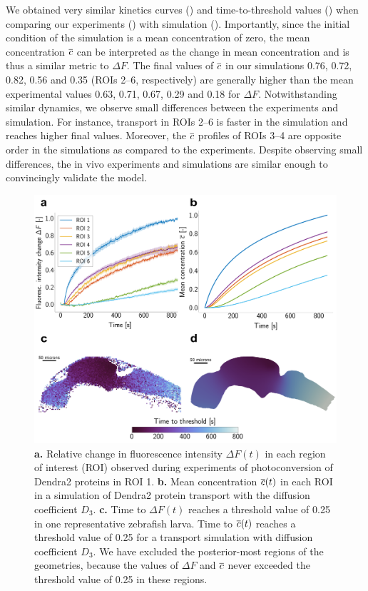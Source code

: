 \documentclass{WileyMSP-template}
\begin{document}
We obtained very similar kinetics curves ()
and time-to-threshold values () when comparing our
experiments () with
simulation ().
Importantly, since the initial condition of the simulation is a mean concentration of zero,
the mean concentration $\overline{c}$ can be interpreted as the change in mean concentration and
is thus a similar metric to $\Delta F$.
The final values of $\overline{c}$ in our simulations 0.76, 0.72, 0.82, 0.56 and 0.35
(ROIs 2--6, respectively)
are generally higher than the mean experimental values 0.63, 0.71, 0.67, 0.29 and 0.18 for $\Delta F$.
Notwithstanding similar dynamics, we observe small differences between the experiments and simulation.
For instance, transport in ROIs 2--6 is faster in the simulation and reaches higher final values.
Moreover, the $\overline{c}$ profiles of ROIs 3--4 are opposite order in
the simulations as compared to the experiments.
Despite observing small differences, the in vivo experiments and
simulations are similar enough to convincingly validate the model.
\begin{figure}[H]
    \centering
    \includegraphics[width=\textwidth]{graphics/figure3_compare_experiments_and_simulations.png}
    \caption{
    \textbf{a.} Relative change in fluorescence intensity $\Delta F(t)$ 
    in each region of interest (ROI)
    observed during experiments of photoconversion of Dendra2 proteins in ROI 1.
    \textbf{b.} Mean concentration $\overline{c}(t)$ in each ROI in a
    simulation of Dendra2 protein transport with
    the diffusion coefficient $D_3$.
    \textbf{c.} Time to $\Delta F(t)$ reaches a threshold value of 0.25 in
    one representative zebrafish larva.
    Time to $\overline{c}(t)$ reaches a threshold value of 0.25 for
    a transport simulation with diffusion coefficient $D_3$.
    We have excluded the posterior-most regions of the geometries,
    because the values of $\Delta F$ and $\overline{c}$ never exceeded the threshold
    value of 0.25 in these regions.}
    \label{fig:fig3}
\end{figure}
\end{document}
